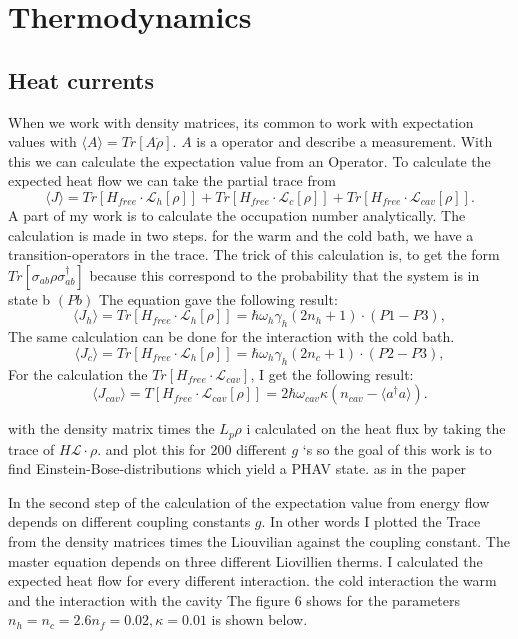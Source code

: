 \documentclass[12pt,a4paper]{article}
\begin{document}
\section{Thermodynamics}
\subsection{Heat currents}

 When we work with density matrices, its common to work with expectation values with $\langle A \rangle=Tr[A\dot{\rho}]$.
 $A$ is a operator and describe a measurement.
With this we can calculate the expectation value from an Operator. 
To calculate the expected heat flow we can take the partial trace from 
\begin{equation}
\langle J\rangle=Tr[H_{free}\cdot \mathcal{L}_h[\rho]]+Tr[H_{free}\cdot \mathcal{L}_c[\rho]]+Tr[H_{free}\cdot \mathcal{L}_{cav}[\rho]].\label{13}
\end{equation}
A part of my work is to calculate the occupation number analytically. 
The calculation is made in two steps. for the warm and the cold bath, we have a transition-operators in the trace.
The trick of this calculation is, to get the form $Tr[\sigma_{ab}\rho \sigma_{ab}^{\dag{}}]$ because this correspond to the probability that the system is in state b $(Pb)$
The equation gave the following result:
\begin{equation}
\langle J_h \rangle=Tr[H_{free}\cdot \mathcal{L}_h[\rho]]=\hbar \omega_h \gamma_h (2n_h+1) \cdot( P1-P3) ,
\end{equation}
The same calculation can be done for the interaction with the cold bath.
\begin{equation}
\langle J_c \rangle=Tr[H_{free}\cdot \mathcal{L}_h[\rho]]=\hbar \omega_h \gamma_h (2n_c+1) \cdot( P2-P3) ,
\end{equation}
For the calculation the $Tr[H_{free}\cdot \mathcal{L}_{cav}]$, I get the following result:
\begin{equation}
\langle J_{cav}\rangle=T[H_{free}\cdot \mathcal{L}_{cav}[\rho]]=2\hbar \omega_{cav}\kappa (n_{cav}-\langle a^{\dag{}}a \rangle).
\end{equation}

with the density matrix times the $L_{p}\rho$ i calculated on the heat flux by taking the trace of $H \mathcal{L}\cdot \rho$. 
and plot this for 200 different  $g$ `s 
so the goal of this work is to find Einstein-Bose-distributions which yield a PHAV state.
as in the paper \cite{Allevi2013} 

In the second step of the calculation of the  expectation value from energy flow depends on different coupling constants $g$.
In other words I plotted the Trace from the density matrices times the Liouvilian against the coupling constant.
The master equation depends on three different Liovillien therms. I calculated the expected heat flow for every different interaction. the cold interaction the warm and the interaction with the cavity
The figure 6 shows  for the parameters $n_h=n_c=2.6 n_f=0.02,\kappa=0.01 $ is shown below.
\end{document}
